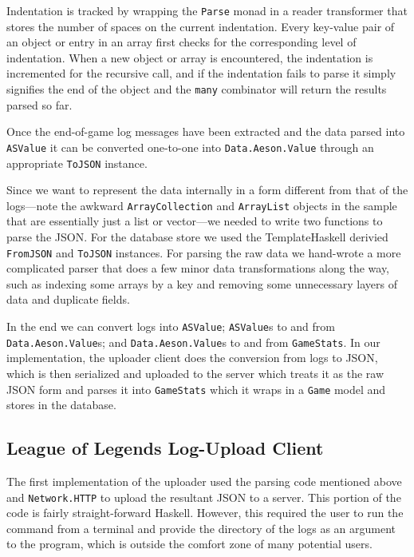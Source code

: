 \documentclass[letterpaper,twocolumn,9pt]{article}
\newcommand{\code}[1]{\texttt{#1}}
\begin{document}
Indentation is tracked by wrapping the \code{Parse} monad in a reader transformer that stores the number of spaces on the current indentation.  Every key-value pair of an object or entry in an array first checks for the corresponding level of indentation.  When a new object or array is encountered, the indentation is incremented for the recursive call, and if the indentation fails to parse it simply signifies the end of the object and the \code{many} combinator will return the results parsed so far.

Once the end-of-game log messages have been extracted and the data parsed into \code{ASValue} it can be converted one-to-one into \code{Data.Aeson.Value} through an appropriate \code{ToJSON} instance.

Since we want to represent the data internally in a form different from that of the logs---note the awkward \code{ArrayCollection} and \code{ArrayList} objects in the sample that are essentially just a list or vector---we needed to write two functions to parse the JSON.  For the database store we used the TemplateHaskell derivied \code{FromJSON} and \code{ToJSON} instances.  For parsing the raw data we hand-wrote a more complicated parser that does a few minor data transformations along the way, such as indexing some arrays by a key and removing some unnecessary layers of data and duplicate fields.

In the end we can convert logs into \code{ASValue}; \code{ASValue}s to and from \code{Data.Aeson.Value}s; and \code{Data.Aeson.Value}s to and from \code{GameStats}.  In our implementation, the uploader client does the conversion from logs to JSON, which is then serialized and uploaded to the server which treats it as the raw JSON form and parses it into \code{GameStats} which it wraps in a \code{Game} model and stores in the database.

\subsection{League of Legends Log-Upload Client}

The first implementation of the uploader used the parsing code mentioned above and \code{Network.HTTP} to upload the resultant JSON to a server.  This portion of the code is fairly straight-forward Haskell.  However, this required the user to run the command from a terminal and provide the directory of the logs as an argument to the program, which is outside the comfort zone of many potential users.
\end{document}

